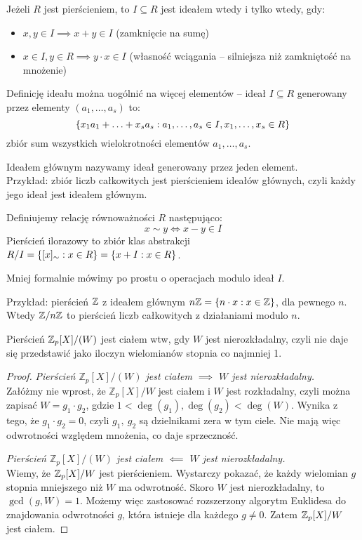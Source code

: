 \begin{definition}[Ideał]
	Jeżeli \( R \) jest pierścieniem, to \( I \subseteq R \) jest ideałem wtedy i tylko wtedy, gdy:
	\begin{itemize}
		\item \( x, y \in I \implies x + y \in I \) (zamknięcie na sumę)
		\item \( x \in I, y \in R \implies y\cdot x \in I \) (własność wciągania -- silniejsza niż zamkniętość na mnożenie)
	\end{itemize}
\end{definition}
Definicję ideału można uogólnić na więcej elementów -- ideał \( I \subseteq R \) generowany przez elementy \( (a_1, \ldots, a_s) \) to:
\[
	\set{ x_1 a_1 + \ldots + x_s a_s : a_1, \ldots, a_s \in I, x_1, \ldots, x_s \in R}
\]
zbiór sum wszystkich wielokrotności elementów \( a_1, \ldots, a_s \).

Ideałem głównym nazywamy ideał generowany przez jeden element. \\
Przykład: zbiór liczb całkowitych jest pierścieniem ideałów głównych, czyli każdy jego ideał jest ideałem głównym.

\begin{definition}
	Definiujemy relację równoważności \( R \) następująco:
	\[
		x \sim y \iff x - y \in I
	\]
	Pierścień ilorazowy to zbiór klas abstrakcji \( R/I = \set{[x]_{\sim} : x \in R} = \set{x + I : x \in R} \).
\end{definition}
Mniej formalnie mówimy po prostu o operacjach modulo ideał \( I \).

Przykład: pierścień \( \mathbb{Z} \) z ideałem głównym \( n \integer = \set{n \cdot x : x \in \integer} \), dla pewnego \( n \).
Wtedy \( \mathbb{Z} / n\mathbb{Z} \) to pierścień liczb całkowitych z działaniami modulo \( n \).
\begin{theorem}
	Pierścień \( \mathbb{Z}_p[X]/(W) \) jest ciałem wtw, gdy \( W \) jest nierozkładalny, czyli nie daje się przedstawić jako iloczyn wielomianów stopnia co najmniej 1.
\end{theorem}
\begin{proof}
	\textit{Pierścień \( \mathbb{Z}_p[X]/(W) \) jest ciałem \( \implies \) \( W \) jest nierozkładalny.} \\
	Załóżmy nie wprost, że \( \mathbb{Z}_p[X]/W \) jest ciałem i \( W \) jest rozkładalny, czyli można zapisać \linebreak \( W = g_1 \cdot g_2 \), gdzie \( 1 < \deg(g_1), \deg(g_2) < \deg(W) \).
	Wynika z tego, że \( g_1 \cdot g_2 = 0 \), czyli \( g_1, \ g_2 \) są dzielnikami zera w tym ciele. Nie mają więc odwrotności względem mnożenia, co daje sprzeczność.

	\textit{Pierścień \( \mathbb{Z}_p[X]/(W) \) jest ciałem \( \impliedby \) \( W \) jest nierozkładalny.} \\
	Wiemy, że \( \mathbb{Z}_p[X]/W \) jest pierścieniem. Wystarczy pokazać, że każdy wielomian \( g \) stopnia mniejszego niż \( W \) ma odwrotność.
	Skoro \( W \) jest nierozkładalny, to \( \gcd(g, W) = 1 \). Możemy więc zastosować rozszerzony algorytm Euklidesa do znajdowania odwrotności \( g \), która istnieje dla każdego \( g \neq 0 \). Zatem \( \mathbb{Z}_p[X]/W \) jest ciałem.
\end{proof}